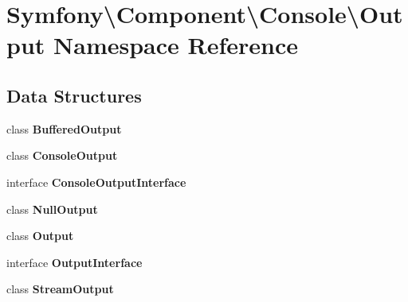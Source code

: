 \section{Symfony\textbackslash{}Component\textbackslash{}Console\textbackslash{}Output Namespace Reference}
\label{namespace_symfony_1_1_component_1_1_console_1_1_output}
\subsection*{Data Structures}
\begin{DoxyCompactItemize}
\item 
class {\bf Buffered\+Output}
\item 
class {\bf Console\+Output}
\item 
interface {\bf Console\+Output\+Interface}
\item 
class {\bf Null\+Output}
\item 
class {\bf Output}
\item 
interface {\bf Output\+Interface}
\item 
class {\bf Stream\+Output}
\end{DoxyCompactItemize}
